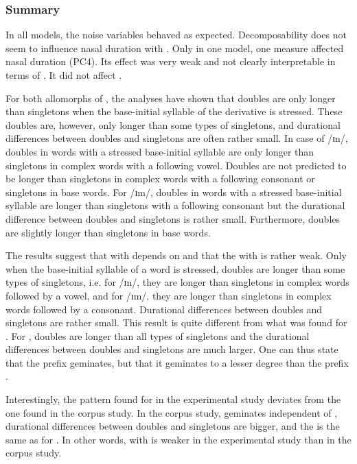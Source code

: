\subsubsection{Summary}\largerpage


In all models, the noise variables behaved as expected. Decomposability does not seem to influence nasal duration with . Only in one model, one  measure affected nasal duration (\textsc{PC4}). Its effect was very weak and not clearly interpretable in terms of . It did not affect .


For both allomorphs of , the analyses have shown that doubles are only longer than singletons when the base-initial syllable of the derivative is stressed. These doubles are, however, only longer than some types of singletons, and durational differences between doubles and singletons are often rather small. 
In case of /ɪn/, doubles in words with a stressed base-initial syllable are only longer than singletons in complex words with a following vowel. Doubles are not predicted to be longer than singletons in complex words with a following consonant or singletons in base words. 
For /ɪm/, doubles in words with a stressed base-initial syllable are longer than singletons with a following consonant but the durational difference between doubles and singletons is rather small.
Furthermore, doubles are slightly longer than singletons in base words.


The results suggest that  with  depends on  and that the  with  is rather weak. Only when the base-initial syllable of a word is stressed, doubles are longer than some types of singletons, i.e. for /ɪn/, they are longer than singletons in complex words followed by a vowel, and for /ɪm/, they are longer than singletons in complex words followed by a consonant. Durational differences between doubles and singletons are rather small. This result is quite different from what was found for . For , doubles are longer than all types of singletons and the durational differences between doubles and singletons are much larger. One can thus state that the prefix  geminates, but that it geminates to a lesser degree than the prefix .

Interestingly, the  pattern found for  in the experimental study deviates from the one found in the corpus study. In the corpus study,  geminates independent of , durational differences between doubles and singletons are bigger, and the  is the same as for . In other words,  with  is weaker in the experimental study than in the corpus study.

